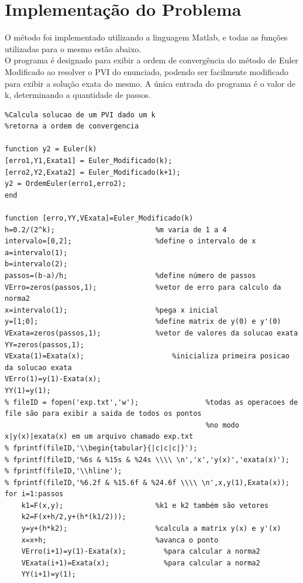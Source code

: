 \documentclass[10pt,a4paper]{article}
\begin{document}
\section{Implementação do Problema}
O método foi implementado utilizando a linguagem Matlab, e todas as funções utilizadas para o mesmo estão abaixo.\\
O programa é designado para exibir a ordem de convergência do método de Euler Modificado ao resolver o PVI do enunciado, podendo ser facilmente modificado para exibir a solução exata do mesmo. A única entrada do programa é o valor de k, determinando a quantidade de passos.
\newpage
\begin{verbatim}
%Calcula solucao de um PVI dado um k
%retorna a ordem de convergencia

function y2 = Euler(k)
[erro1,Y1,Exata1] = Euler_Modificado(k);
[erro2,Y2,Exata2] = Euler_Modificado(k+1);
y2 = OrdemEuler(erro1,erro2);
end

function [erro,YY,VExata]=Euler_Modificado(k)
h=0.2/(2^k);                        %m varia de 1 a 4
intervalo=[0,2];                    %define o intervalo de x
a=intervalo(1);
b=intervalo(2);
passos=(b-a)/h;                     %define número de passos
VErro=zeros(passos,1);              %vetor de erro para calculo da norma2
x=intervalo(1);                     %pega x inicial
y=[1;0];                            %define matrix de y(0) e y'(0)
VExata=zeros(passos,1);             %vetor de valores da solucao exata
YY=zeros(passos,1);
VExata(1)=Exata(x);                     %inicializa primeira posicao da solucao exata
VErro(1)=y(1)-Exata(x);
YY(1)=y(1);
% fileID = fopen('exp.txt','w');                %todas as operacoes de file são para exibir a saida de todos os pontos
                                                %no modo x|y(x)|exata(x) em um arquivo chamado exp.txt
% fprintf(fileID,'\\begin{tabular}{|c|c|c|}');
% fprintf(fileID,'%6s & %15s & %24s \\\\ \n','x','y(x)','exata(x)');
% fprintf(fileID,'\\hline');
% fprintf(fileID,'%6.2f & %15.6f & %24.6f \\\\ \n',x,y(1),Exata(x));
for i=1:passos
    k1=F(x,y);                      %k1 e k2 também são vetores
    k2=F(x+h/2,y+(h*(k1/2)));
    y=y+(h*k2);                     %calcula a matrix y(x) e y'(x)
    x=x+h;                          %avanca o ponto
    VErro(i+1)=y(1)-Exata(x);         %para calcular a norma2
    VExata(i+1)=Exata(x);             %para calcular a norma2
    YY(i+1)=y(1);


\end{verbatim}
\end{document}
